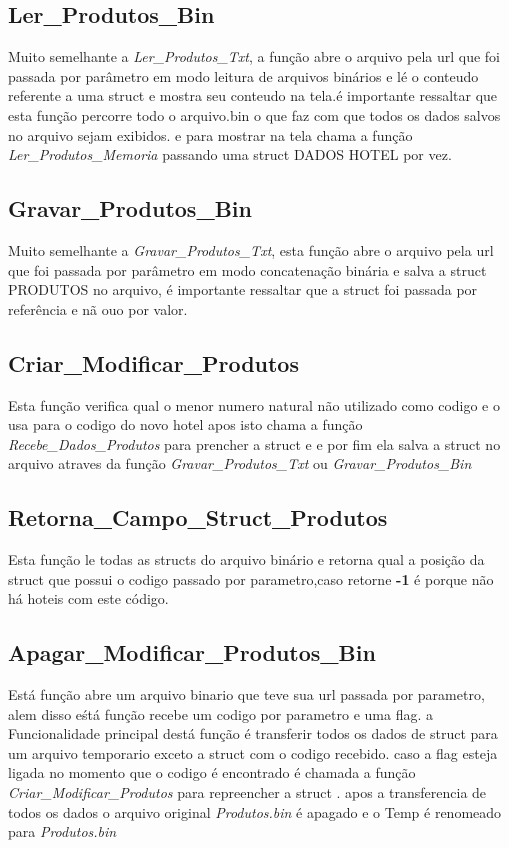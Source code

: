 \documentclass{article}
\begin{document}
\subsection{Ler\_Produtos\_Bin}
	Muito semelhante a \textit{Ler\_Produtos\_Txt}, a função abre o arquivo pela url que foi passada por parâmetro em modo leitura de arquivos binários e lé o conteudo referente a uma struct e mostra seu conteudo na tela.é importante ressaltar que esta função percorre todo o arquivo.bin o que faz com que todos os dados salvos no arquivo sejam exibidos. e para mostrar na tela chama a função \textit{Ler\_Produtos\_Memoria} passando uma struct DADOS HOTEL  por vez.

\subsection{Gravar\_Produtos\_Bin}
	Muito semelhante a \textit{Gravar\_Produtos\_Txt}, esta função abre o arquivo pela url que foi passada por parâmetro em modo concatenação binária e salva a struct PRODUTOS  no arquivo, é importante ressaltar que  a struct foi passada por referência e nã ouo por valor.

\subsection{Criar\_Modificar\_Produtos}
	Esta função verifica qual o menor numero natural não utilizado como codigo e o usa para o codigo do novo hotel apos isto  chama a função \textit{Recebe\_Dados\_Produtos} para prencher a struct e e por fim ela salva a struct no arquivo atraves da função \textit{Gravar\_Produtos\_Txt} ou \textit{Gravar\_Produtos\_Bin}

\subsection{Retorna\_Campo\_Struct\_Produtos}
	Esta função le todas as structs do arquivo binário e retorna qual a posição da struct que possui o codigo passado por parametro,caso retorne \textbf{-1} é porque não há hoteis com este código.

\subsection{Apagar\_Modificar\_Produtos\_Bin}
	Está função abre um arquivo binario que teve sua  url passada por parametro, alem disso eśtá função recebe um codigo por parametro e uma flag.
	a Funcionalidade principal destá função é transferir todos os dados de struct para um arquivo temporario exceto a struct com o codigo recebido. caso a flag esteja ligada no momento que o codigo é encontrado é chamada a função \textit{Criar\_Modificar\_Produtos} para repreencher a struct . apos a transferencia de todos os dados o arquivo original \textit{Produtos.bin} é apagado e o Temp é renomeado para \textit{Produtos.bin}
\end{document}
